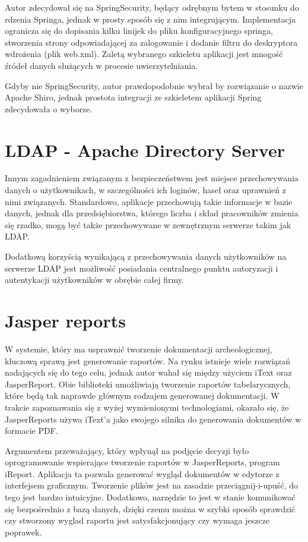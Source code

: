 Autor zdecydował się na SpringSecurity, będący odrębnym bytem w stosunku do rdzenia Springa, jednak w prosty sposób się z nim integrującym. Implementacja ogranicza się do dopisania kilku linijek do pliku konfiguracyjnego springa, stworzenia strony odpowiadającej za zalogowanie i dodanie filtru do deskryptora wdrożenia (plik web.xml). Zaletą wybranego szkieletu aplikacji jest mnogość źródeł danych służących w procesie uwierzytelniania.

Gdyby nie SpringSecurity, autor prawdopodobnie wybrał by rozwiązanie o nazwie Apache Shiro, jednak prostota integracji ze szkieletem aplikacji Spring zdecydowała o wyborze.

\section{LDAP - Apache Directory Server}
Innym zagadnieniem związanym z bezpieczeństwem jest miejsce przechowywania danych o użytkownikach, w szczególności ich loginów, haseł oraz uprawnień z nimi związanych. Standardowo, aplikacje przechowują takie informacje w bazie danych, jednak dla przedsiębiorstwa, którego liczba i skład pracowników zmienia się rzadko, mogą być także przechowywane w zewnętrznym serwerze takim jak LDAP.

Dodatkową korzyścią wynikającą z przechowywania danych użytkowników na serwerze LDAP jest możliwość posiadania centralnego punktu autoryzacji i autentykacji użytkowników w obrębie całej firmy. 

\newpage
\section{Jasper reports}
W systemie, który ma usprawnić tworzenie dokumentacji archeologicznej, kluczową sprawą jest generowanie raportów. Na rynku istnieje wiele rozwiązań nadających się do tego celu, jednak autor wahał się między użyciem iText oraz JasperReport. Obie biblioteki umożliwiają tworzenie raportów tabelarycznych, które będą tak naprawde głównym rodzajem generowanej dokumentacji. W trakcie zapoznawania się z wyżej wymienionymi technologiami, okazało się, że JasperReports używa iText'a jako swojego silnika do generowania dokumentów w formacie PDF. 

Argumentem przeważający, który wpłynął na podjęcie decyzji było oprogramowanie wspierające tworzenie raportów w JasperReports, program iReport. Aplikacja ta pozwala generować wygląd dokumentów w edytorze z interfejsem graficznym. Tworzenie plików jest na zasadzie przeciągnij-i-upuść, do tego jest bardzo intuicyjne. Dodatkowo, narzędzie to jest w stanie komunikować się bezpośrednio z bazą danych, dzięki czemu można w szybki sposób sprawdzić czy stworzony wyglad raportu jest satysfakcjonujący czy wymaga jeszcze poprawek. 

